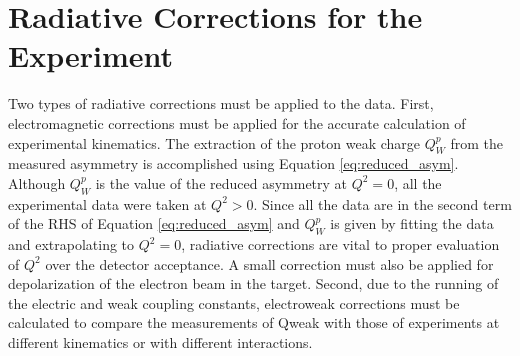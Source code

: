 \section{Radiative Corrections for the \Qs Experiment}
Two types of radiative corrections must be applied to the \Qs data. First, electromagnetic corrections must be applied  for the accurate calculation of experimental kinematics. The extraction of the proton weak charge $Q_W^p$ from the measured asymmetry is accomplished using Equation \ref{eq:reduced_asym}. Although $Q_W^p$ is the value of the reduced asymmetry at $Q^2=0$, all the experimental data were taken at $Q^2>0$. Since all the data are in the second term of the RHS of Equation \ref{eq:reduced_asym} and $Q_W^p$ is given by fitting the data and extrapolating to $Q^2=0$, radiative corrections are vital to proper evaluation of $Q^2$ over the detector acceptance. A small correction must also be applied for depolarization of the electron beam in the target. Second, due to the running of the electric and weak coupling constants, electroweak corrections must be calculated to compare the measurements of Qweak with those of experiments at different kinematics or with different interactions. 

